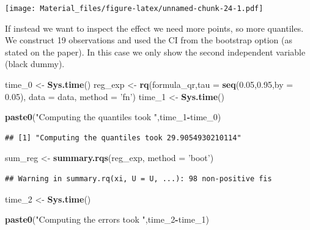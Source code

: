 \documentclass[]{book}
\newenvironment{Shaded}{\begin{snugshade}}{\end{snugshade}}
\newcommand{\KeywordTok}[1]{\textcolor[rgb]{0.13,0.29,0.53}{\textbf{#1}}}
\newcommand{\DataTypeTok}[1]{\textcolor[rgb]{0.13,0.29,0.53}{#1}}
\newcommand{\DecValTok}[1]{\textcolor[rgb]{0.00,0.00,0.81}{#1}}
\newcommand{\FloatTok}[1]{\textcolor[rgb]{0.00,0.00,0.81}{#1}}
\newcommand{\StringTok}[1]{\textcolor[rgb]{0.31,0.60,0.02}{#1}}
\newcommand{\OperatorTok}[1]{\textcolor[rgb]{0.81,0.36,0.00}{\textbf{#1}}}
\newcommand{\NormalTok}[1]{#1}
\begin{document}
\texttt{[image: Material\_files/figure-latex/unnamed-chunk-24-1.pdf]}

If instead we want to inspect the effect we need more points, so more
quantiles. We construct 19 observations and used the CI from the
bootstrap option (as stated on the paper). In this case we only show the
second independent variable (black dummy).

\begin{Shaded}
\begin{Highlighting}[]
\NormalTok{time_}\DecValTok{0}\NormalTok{ <-}\StringTok{ }\KeywordTok{Sys.time}\NormalTok{()}
\NormalTok{reg_exp <-}\StringTok{ }\KeywordTok{rq}\NormalTok{(formula_qr,}\DataTypeTok{tau =} \KeywordTok{seq}\NormalTok{(}\FloatTok{0.05}\NormalTok{,}\FloatTok{0.95}\NormalTok{,}\DataTypeTok{by =} \FloatTok{0.05}\NormalTok{), }\DataTypeTok{data =}\NormalTok{ data, }\DataTypeTok{method =} \StringTok{'fn'}\NormalTok{)}
\NormalTok{time_}\DecValTok{1}\NormalTok{ <-}\StringTok{ }\KeywordTok{Sys.time}\NormalTok{()}

\KeywordTok{paste0}\NormalTok{(}\StringTok{"Computing the quantiles took "}\NormalTok{,time_}\DecValTok{1}\OperatorTok{-}\NormalTok{time_}\DecValTok{0}\NormalTok{)}
\end{Highlighting}
\end{Shaded}

\begin{verbatim}
## [1] "Computing the quantiles took 29.9054930210114"
\end{verbatim}

\begin{Shaded}
\begin{Highlighting}[]
\NormalTok{sum_reg <-}\StringTok{ }\KeywordTok{summary.rqs}\NormalTok{(reg_exp, }\DataTypeTok{method =} \StringTok{'boot'}\NormalTok{)}
\end{Highlighting}
\end{Shaded}

\begin{verbatim}
## Warning in summary.rq(xi, U = U, ...): 98 non-positive fis
\end{verbatim}

\begin{Shaded}
\begin{Highlighting}[]
\NormalTok{time_}\DecValTok{2}\NormalTok{ <-}\StringTok{ }\KeywordTok{Sys.time}\NormalTok{()}

\KeywordTok{paste0}\NormalTok{(}\StringTok{"Computing the errors took "}\NormalTok{,time_}\DecValTok{2}\OperatorTok{-}\NormalTok{time_}\DecValTok{1}\NormalTok{)}
\end{Highlighting}
\end{Shaded}
\end{document}
